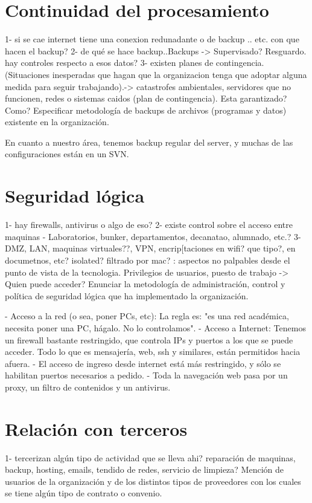 \documentclass[10pt,a4paper,final]{article}
\begin{document}
\section{Continuidad del procesamiento}
1- si se cae internet tiene una conexion redunadante o de backup .. etc. con que hacen el backup?
2- de qué se hace backup..Backups -> Supervisado? Resguardo. hay controles respecto a esos datos?
3- existen planes de contingencia.
 (Situaciones inesperadas que hagan que la organizacion tenga que adoptar alguna medida para seguir trabajando).-> catastrofes ambientales, servidores que no funcionen, redes o sistemas caidos (plan de contingencia). Esta garantizado? Como?
 Especificar metodología de backups de archivos (programas y datos) existente en la organización.

En cuanto a nuestro área, tenemos backup regular del server, y muchas de las configuraciones están en un SVN. 
\section{Seguridad lógica}
1- hay firewalls, antivirus o algo de eso?
2- existe control sobre el acceso entre maquinas - Laboratorios, bunker, departamentos, decanatao, alumnado, etc.?
3- DMZ, LAN, maquinas virtuales??, VPN, encrip[taciones en wifi? que tipo?, en documetnos, etc? isolated? filtrado por mac?
: aspectos no palpables desde el punto de vista de la tecnologia. Privilegios de usuarios, puesto de trabajo -> Quien puede acceder? 
Enunciar la metodología de administración, control y política de seguridad lógica que ha implementado la organización.


- Acceso a la red (o sea, poner PCs, etc): La regla es: "es una red académica, necesita poner una PC, hágalo. No lo controlamos".
- Acceso a Internet: Tenemos un firewall bastante restringido, que controla IPs y puertos a los que se puede acceder. Todo lo que es mensajería, web, ssh y similares, están permitidos hacia afuera.
  - El acceso de ingreso desde internet está más restringido, y sólo se habilitan puertos necesarios a pedido.
- Toda la navegación web pasa por un proxy, un filtro de contenidos y un antivirus.
\section{Relación con terceros}
1- tercerizan algún tipo de actividad que se lleva ahi? reparación de maquinas, backup, hosting, emails, tendido de redes, servicio de limpieza?
Mención de usuarios de la organización y de los distintos tipos de proveedores con los cuales se tiene algún tipo de contrato o convenio.
\end{document}
